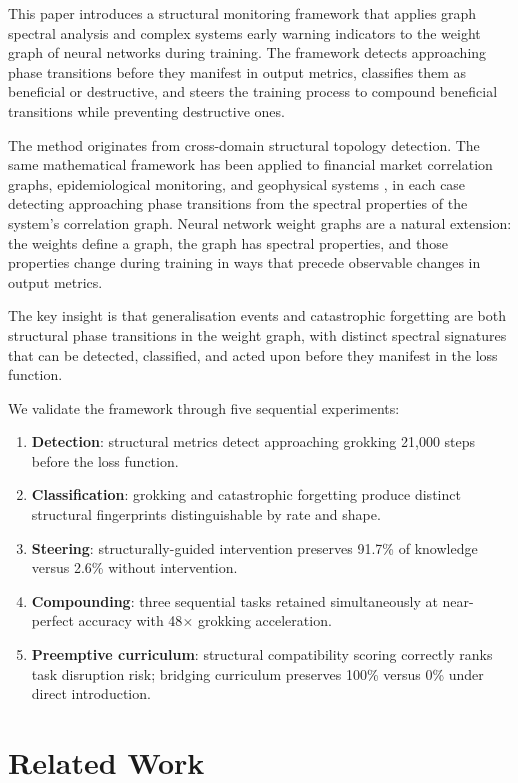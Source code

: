 \documentclass[10pt,twocolumn]{article}
\begin{document}
This paper introduces a structural monitoring framework that applies graph spectral analysis and complex systems early warning indicators to the weight graph of neural networks during training. The framework detects approaching phase transitions before they manifest in output metrics, classifies them as beneficial or destructive, and steers the training process to compound beneficial transitions while preventing destructive ones.

The method originates from cross-domain structural topology detection. The same mathematical framework has been applied to financial market correlation graphs, epidemiological monitoring, and geophysical systems \citep{benfield2025}, in each case detecting approaching phase transitions from the spectral properties of the system's correlation graph. Neural network weight graphs are a natural extension: the weights define a graph, the graph has spectral properties, and those properties change during training in ways that precede observable changes in output metrics.

The key insight is that generalisation events and catastrophic forgetting are both structural phase transitions in the weight graph, with distinct spectral signatures that can be detected, classified, and acted upon before they manifest in the loss function.

We validate the framework through five sequential experiments:
\begin{enumerate}
  \item \textbf{Detection}: structural metrics detect approaching grokking 21,000 steps before the loss function.
  \item \textbf{Classification}: grokking and catastrophic forgetting produce distinct structural fingerprints distinguishable by rate and shape.
  \item \textbf{Steering}: structurally-guided intervention preserves 91.7\% of knowledge versus 2.6\% without intervention.
  \item \textbf{Compounding}: three sequential tasks retained simultaneously at near-perfect accuracy with 48$\times$ grokking acceleration.
  \item \textbf{Preemptive curriculum}: structural compatibility scoring correctly ranks task disruption risk; bridging curriculum preserves 100\% versus 0\% under direct introduction.
\end{enumerate}

\section{Related Work}
\end{document}
